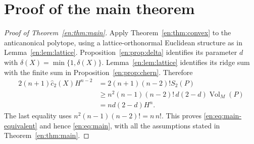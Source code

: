 \documentclass[12pt]{amsart}
\theoremstyle{definition}
\theoremstyle{remark}
\numberwithin{equation}{section}
\theoremstyle{plain}
\theoremstyle{definition}
\theoremstyle{remark}
\begin{document}
\section{Proof of the main theorem}\label{en:sec:main-proof}
\begin{proof}[Proof of Theorem~\ref{en:thm:main}]
Apply Theorem~\ref{en:thm:convex} to the anticanonical polytope, using a lattice-orthonormal Euclidean structure as in Lemma~\ref{en:lem:lattice}. Proposition~\ref{en:prop:delta} identifies its parameter $d$ with $\delta(X)=\min\{1,\delta(X)\}$. Lemma~\ref{en:lem:lattice} identifies its ridge sum with the finite sum in Proposition~\ref{en:prop:chern}. Therefore
\begin{equation}\label{en:eq:return}
 \begin{aligned}
 2(n+1)\widehat c_2(X)H^{n-2}
 &=2(n+1)(n-2)!S_2(P)\\
 &\ge n^2(n-1)(n-2)!\,d(2-d)\operatorname{Vol}_M(P)\\
 &=nd(2-d)H^n.
 \end{aligned}
\end{equation}
The last equality uses $n^2(n-1)(n-2)!=n\,n!$. This proves
\eqref{en:eq:main-equivalent} and hence \eqref{en:eq:main}, with all the assumptions stated in Theorem~\ref{en:thm:main}.
\end{proof}
\end{document}
